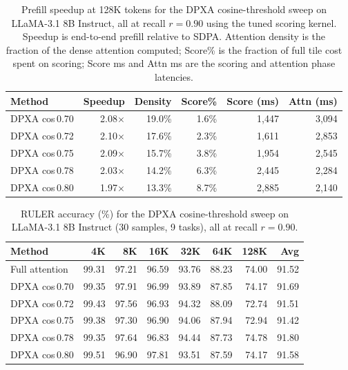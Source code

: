\begin{table}[!ht]
\centering
\caption{Prefill speedup at 128K tokens for the DPXA cosine-threshold sweep on LLaMA-3.1 8B Instruct, all at recall $r{=}0.90$ using the tuned scoring kernel. Speedup is end-to-end prefill relative to SDPA. Attention density is the fraction of the dense attention computed; Score\% is the fraction of full tile cost spent on scoring; Score ms and Attn ms are the scoring and attention phase latencies.}
\label{tab:cos_speedup}
\begin{tabular}{lrrrrr}
\toprule
Method & Speedup & Density & Score\% & Score (ms) & Attn (ms) \\
\midrule
DPXA cos\,0.70 & 2.08$\times$ & 19.0\% & 1.6\% & 1{,}447 & 3{,}094 \\
DPXA cos\,0.72 & 2.10$\times$ & 17.6\% & 2.3\% & 1{,}611 & 2{,}853 \\
DPXA cos\,0.75 & 2.09$\times$ & 15.7\% & 3.8\% & 1{,}954 & 2{,}545 \\
DPXA cos\,0.78 & 2.03$\times$ & 14.2\% & 6.3\% & 2{,}445 & 2{,}284 \\
DPXA cos\,0.80 & 1.97$\times$ & 13.3\% & 8.7\% & 2{,}885 & 2{,}140 \\
\bottomrule
\end{tabular}
\end{table}

\begin{table}[!ht]
\centering
\caption{RULER accuracy (\%) for the DPXA cosine-threshold sweep on LLaMA-3.1 8B Instruct (30 samples, 9 tasks), all at recall $r{=}0.90$.}
\label{tab:cos_ruler}
\begin{tabular}{lrrrrrrr}
\toprule
Method & 4K & 8K & 16K & 32K & 64K & 128K & Avg \\
\midrule
Full attention & 99.31 & 97.21 & 96.59 & 93.76 & 88.23 & 74.00 & 91.52 \\
\midrule
DPXA cos\,0.70 & 99.35 & 97.91 & 96.99 & 93.89 & 87.85 & 74.17 & 91.69 \\
DPXA cos\,0.72 & 99.43 & 97.56 & 96.93 & 94.32 & 88.09 & 72.74 & 91.51 \\
DPXA cos\,0.75 & 99.38 & 97.30 & 96.90 & 94.06 & 87.94 & 72.94 & 91.42 \\
DPXA cos\,0.78 & 99.35 & 97.64 & 96.83 & 94.44 & 87.73 & 74.78 & 91.80 \\
DPXA cos\,0.80 & 99.51 & 96.90 & 97.81 & 93.51 & 87.59 & 74.17 & 91.58 \\
\bottomrule
\end{tabular}
\end{table}


